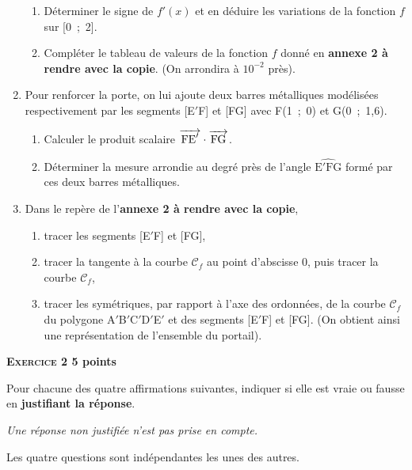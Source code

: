 \documentclass[10pt]{article}
\newcommand{\vect}[1]{\overrightarrow{\,\mathstrut#1\,}}
\begin{document}
\begin{enumerate}
	\begin{enumerate}
		\item Déterminer le signe de $f'(x)$ et en déduire les variations de la fonction $f$ sur [0~;~2]. 
		\item Compléter le tableau de valeurs de la fonction $f$ donné en \textbf{annexe 2 à rendre avec la copie}. (On arrondira à $10^{-2}$ près). 
	\end{enumerate}
\item Pour renforcer la porte, on lui ajoute deux barres métalliques modélisées respectivement par les segments [E$'$F] et [FG] avec F(1~;~0) et G(0~;~1,6).
	\begin{enumerate}
		\item Calculer le produit scalaire $\vect{\text{FE}'} \cdot  \vect{\text{FG}}$. 
		\item Déterminer la mesure arrondie au degré près de l'angle $\widehat{\text{E}'\text{FG}}$ formé par ces deux barres métalliques. 
	\end{enumerate}
\item Dans le repère de l'\textbf{annexe 2 à rendre avec la copie}, 
	\begin{enumerate}
		\item tracer les segments [E$'$F] et [FG],
		\item tracer la tangente à la courbe $\mathcal{C}_f$ au point d'abscisse 0, puis tracer la courbe $\mathcal{C}_f$,
		\item tracer les symétriques, par rapport à l'axe des ordonnées, de la courbe $\mathcal{C}_f$ du polygone A$'$B$'$C$'$D$'$E$'$ et des segments [E$'$F] et [FG]. (On obtient ainsi une représentation de l'ensemble du portail). 
	\end{enumerate}
\end{enumerate}

\vspace{0.5cm}

\textbf{\textsc{Exercice 2}  \hfill 5 points}

\medskip 

Pour chacune des quatre affirmations suivantes, indiquer si elle est vraie ou fausse en \textbf{justifiant la réponse}. 

\emph{Une réponse non justifiée n'est pas prise en compte.} 

Les quatre questions sont indépendantes les unes des autres. 

\medskip
\end{document}

